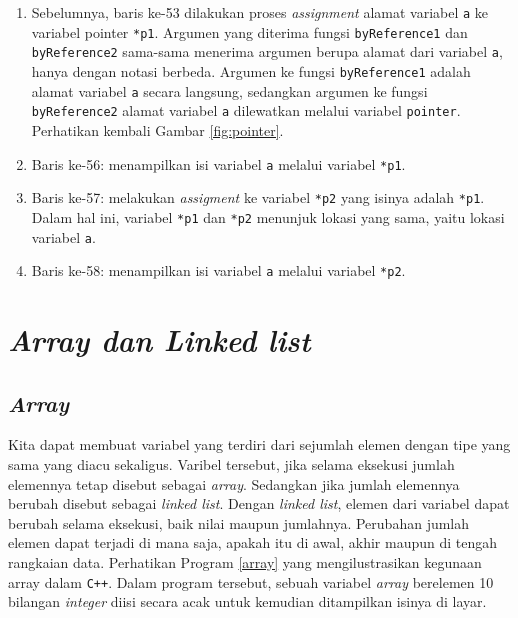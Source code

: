 \begin{enumerate}
\item Sebelumnya, baris ke-53 dilakukan proses \textit{assignment} alamat variabel \texttt{a} ke variabel pointer \texttt{*p1}. Argumen yang diterima fungsi \texttt{byReference1} dan \texttt{byReference2} sama-sama menerima argumen berupa alamat dari variabel \texttt{a}, hanya dengan notasi berbeda. Argumen ke fungsi \texttt{byReference1} adalah alamat variabel \texttt{a} secara langsung, sedangkan argumen ke fungsi \texttt{byReference2} alamat variabel \texttt{a} dilewatkan melalui variabel \texttt{pointer}. Perhatikan kembali Gambar \ref{fig:pointer}.
\item Baris ke-56: menampilkan isi variabel \texttt{a} melalui variabel \texttt{*p1}.
\item Baris ke-57: melakukan \textit{assigment} ke variabel \texttt{*p2} yang isinya adalah \texttt{*p1}. Dalam hal ini, variabel \texttt{*p1} dan \texttt{*p2} menunjuk lokasi yang sama, yaitu lokasi variabel \texttt{a}.
\item Baris ke-58: menampilkan isi variabel \texttt{a} melalui variabel \texttt{*p2}. 
\end{enumerate}

\chapter{\textit{Array dan Linked list}}
\section{\textit{Array}}
Kita dapat membuat variabel yang terdiri dari sejumlah elemen dengan tipe yang sama yang diacu sekaligus. Varibel tersebut, jika selama eksekusi jumlah elemennya tetap disebut sebagai \textit{array}. Sedangkan jika jumlah elemennya berubah disebut sebagai \textit{linked list}. Dengan \textit{linked list}, elemen dari variabel dapat berubah selama eksekusi, baik nilai maupun jumlahnya. Perubahan jumlah elemen dapat terjadi di mana saja, apakah itu di awal, akhir maupun di tengah rangkaian data. Perhatikan Program \ref{array} yang mengilustrasikan kegunaan array dalam \texttt{C++}. Dalam program tersebut, sebuah variabel \textit{array} berelemen 10 bilangan \textit{integer} diisi secara acak untuk kemudian ditampilkan isinya di layar.

\scriptsize

\normalsize

